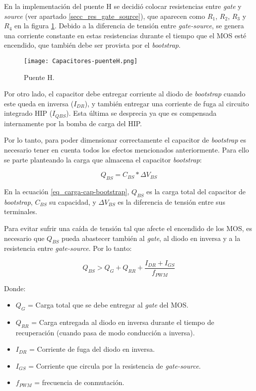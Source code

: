 \noindent En la implementación del puente H se decidió colocar resistencias entre \textsl{gate} y \textsl{source} (ver apartado \ref{secc_res_gate_source}), que aparecen como $R_1$, $R_2$, $R_3$ y $R_4$ en la figura \ref{fig:img_capacitores-puenteH}. Debido a la diferencia de tensión entre \textsl{gate-source}, se genera una corriente constante en estas resistencias durante el tiempo que el MOS esté encendido, que también debe ser provista por el  \textsl{bootstrap}.

\begin{figure}[H]
	\centering
	\texttt{[image: Capacitores-puenteH.png]}
	\caption{Puente H.}
	\label{fig:img_capacitores-puenteH}
\end{figure}

\noindent Por otro lado, el capacitor debe entregar corriente al diodo de \textsl{bootstrap} cuando este queda en inversa ($I_{DR}$), y también entregar una corriente de fuga al circuito integrado HIP ($I_{QBS}$). Esta última se desprecia ya que es compensada internamente por la bomba de carga del HIP.

\noindent Por lo tanto, para poder dimensionar correctamente el capacitor de \textsl{bootstrap} es necesario tener en cuenta todos los efectos mencionados anteriormente. Para ello se parte planteando la carga que almacena el capacitor \textsl{bootstrap}:

\begin{equation} \label{eq_carga-cap-bootstrap}
	Q_{BS}=C_{BS}*\Delta V_{BS}
\end{equation}

\noindent En la ecuación \ref{eq_carga-cap-bootstrap}, $Q_{BS}$ es la carga total del capacitor de \textsl{bootstrap}, $C_{BS}$ su capacidad, y $\Delta V_{BS}$ es la diferencia de  tensión entre sus terminales. 

\noindent Para evitar sufrir una caída de tensión tal que afecte el encendido de los MOS, es necesario que $Q_{BS}$ pueda abastecer también al \textsl{gate}, al diodo en inversa y a la resistencia entre \textsl{gate-source}. Por lo tanto:

\begin{equation} \label{eq_carga-cap-bootstrap2}
	Q_{BS} > Q_G + Q_{RR} + \frac{I_{DR}+I_{GS}}{f_{PWM}}
\end{equation}

\noindent Donde:
\begin{itemize}
	\item $Q_G$ = Carga total que se debe entregar al \textsl{gate} del MOS.
	\item $Q_{RR}$ = Carga entregada al diodo en inversa durante el tiempo de recuperación (cuando pasa de modo conducción a inversa).
	\item $I_{DR}$ = Corriente de fuga del diodo en inversa.
	\item $I_{GS}$ = Corriente que circula por la resistencia de \textsl{gate-source}.
	\item $f_{PWM}$ = frecuencia de conmutación.
\end{itemize}



